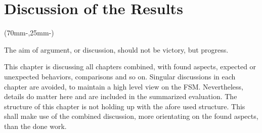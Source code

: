 

\chapter{Discussion of the Results}
\label{chap:discussion}

\begin{textblock*}{.7\textwidth}(70mm-\offset,25mm-\offset)
    \begin{fquote}
        The aim of argument, or discussion, should not be victory, but progress.
    \end{fquote}
\end{textblock*}

This chapter is discussing all chapters combined, with found aspects, expected or unexpected behaviors, comparisons and so on.
Singular discussions in each chapter are avoided, to maintain a high level view on the \acf{FSM}.
Nevertheless, details do matter here and are included in the summarized evaluation.
The structure of this chapter is not holding up with the afore used structure.
This shall make use of the combined discussion, more orientating on the found aspects, than the done work. 





